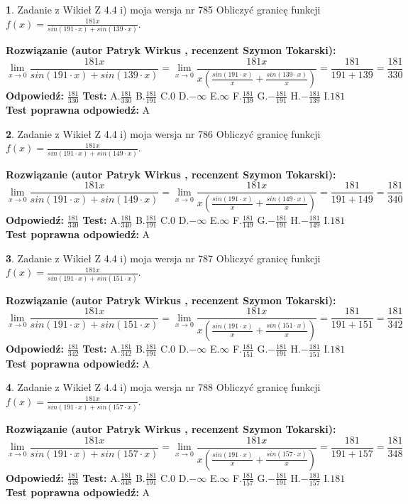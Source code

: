 \documentclass[12pt, a4paper]{article}
\theoremstyle{definition} %
\newtheorem{zad}{}
\newcommand{\zadStart}[1]{\begin{zad}#1\newline}
\newcommand{\zadStop}{\end{zad}}
\newcommand{\rozwStart}[2]{\noindent \textbf{Rozwiązanie (autor #1 , recenzent #2): }\newline}
\newcommand{\rozwStop}{\newline}
\newcommand{\odpStart}{\noindent \textbf{Odpowiedź:}\newline}
\newcommand{\odpStop}{\newline}
\newcommand{\testStart}{\noindent \textbf{Test:}\newline}
\newcommand{\testStop}{\newline}
\newcommand{\kluczStart}{\noindent \textbf{Test poprawna odpowiedź:}\newline}
\newcommand{\kluczStop}{\newline}
\begin{document}
\zadStart{Zadanie z Wikieł Z 4.4 i) moja wersja nr 785}
Obliczyć granicę funkcji $f(x)=\frac{181x}{sin(191\cdot x) +sin(139\cdot x)}$.
\zadStop
\rozwStart{Patryk Wirkus}{Szymon Tokarski}
$$\lim\limits_{x\to 0}\frac{181x}{sin(191\cdot x) +sin(139\cdot x)}=\lim\limits_{x\to 0}\frac{181x}{x(\frac{sin(191\cdot x)}{x}+\frac{sin(139\cdot x)}{x})}=\frac{181}{191+139} = \frac{181}{330}$$
\rozwStop
\odpStart
$\frac{181}{330}$
\odpStop
\testStart
A.$\frac{181}{330}$
B.$\frac{181}{191}$
C.$0$
D.$-\infty$
E.$\infty$
F.$\frac{181}{139}$
G.$-\frac{181}{191}$
H.$-\frac{181}{139}$
I.$181$
\testStop
\kluczStart
A
\kluczStop



\zadStart{Zadanie z Wikieł Z 4.4 i) moja wersja nr 786}
Obliczyć granicę funkcji $f(x)=\frac{181x}{sin(191\cdot x) +sin(149\cdot x)}$.
\zadStop
\rozwStart{Patryk Wirkus}{Szymon Tokarski}
$$\lim\limits_{x\to 0}\frac{181x}{sin(191\cdot x) +sin(149\cdot x)}=\lim\limits_{x\to 0}\frac{181x}{x(\frac{sin(191\cdot x)}{x}+\frac{sin(149\cdot x)}{x})}=\frac{181}{191+149} = \frac{181}{340}$$
\rozwStop
\odpStart
$\frac{181}{340}$
\odpStop
\testStart
A.$\frac{181}{340}$
B.$\frac{181}{191}$
C.$0$
D.$-\infty$
E.$\infty$
F.$\frac{181}{149}$
G.$-\frac{181}{191}$
H.$-\frac{181}{149}$
I.$181$
\testStop
\kluczStart
A
\kluczStop



\zadStart{Zadanie z Wikieł Z 4.4 i) moja wersja nr 787}
Obliczyć granicę funkcji $f(x)=\frac{181x}{sin(191\cdot x) +sin(151\cdot x)}$.
\zadStop
\rozwStart{Patryk Wirkus}{Szymon Tokarski}
$$\lim\limits_{x\to 0}\frac{181x}{sin(191\cdot x) +sin(151\cdot x)}=\lim\limits_{x\to 0}\frac{181x}{x(\frac{sin(191\cdot x)}{x}+\frac{sin(151\cdot x)}{x})}=\frac{181}{191+151} = \frac{181}{342}$$
\rozwStop
\odpStart
$\frac{181}{342}$
\odpStop
\testStart
A.$\frac{181}{342}$
B.$\frac{181}{191}$
C.$0$
D.$-\infty$
E.$\infty$
F.$\frac{181}{151}$
G.$-\frac{181}{191}$
H.$-\frac{181}{151}$
I.$181$
\testStop
\kluczStart
A
\kluczStop



\zadStart{Zadanie z Wikieł Z 4.4 i) moja wersja nr 788}
Obliczyć granicę funkcji $f(x)=\frac{181x}{sin(191\cdot x) +sin(157\cdot x)}$.
\zadStop
\rozwStart{Patryk Wirkus}{Szymon Tokarski}
$$\lim\limits_{x\to 0}\frac{181x}{sin(191\cdot x) +sin(157\cdot x)}=\lim\limits_{x\to 0}\frac{181x}{x(\frac{sin(191\cdot x)}{x}+\frac{sin(157\cdot x)}{x})}=\frac{181}{191+157} = \frac{181}{348}$$
\rozwStop
\odpStart
$\frac{181}{348}$
\odpStop
\testStart
A.$\frac{181}{348}$
B.$\frac{181}{191}$
C.$0$
D.$-\infty$
E.$\infty$
F.$\frac{181}{157}$
G.$-\frac{181}{191}$
H.$-\frac{181}{157}$
I.$181$
\testStop
\kluczStart
A
\kluczStop
\end{document}
